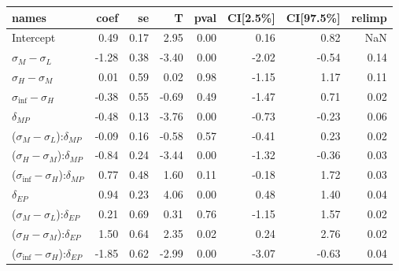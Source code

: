 \begin{tabular}{lrrrrrrr}
\toprule
                                       names &  coef &   se &     T &  pval &  CI[2.5\%] &  CI[97.5\%] &  relimp \\
\midrule
                                   Intercept &  0.49 & 0.17 &  2.95 &  0.00 &       0.16 &        0.82 &     NaN \\
                   $\sigma_{M} - \sigma_{L}$ & -1.28 & 0.38 & -3.40 &  0.00 &      -2.02 &       -0.54 &    0.14 \\
                   $\sigma_{H} - \sigma_{M}$ &  0.01 & 0.59 &  0.02 &  0.98 &      -1.15 &        1.17 &    0.11 \\
                $\sigma_{\inf} - \sigma_{H}$ & -0.38 & 0.55 & -0.69 &  0.49 &      -1.47 &        0.71 &    0.02 \\
                               $\delta_{MP}$ & -0.48 & 0.13 & -3.76 &  0.00 &      -0.73 &       -0.23 &    0.06 \\
   ($\sigma_{M} - \sigma_{L}$):$\delta_{MP}$ & -0.09 & 0.16 & -0.58 &  0.57 &      -0.41 &        0.23 &    0.02 \\
   ($\sigma_{H} - \sigma_{M}$):$\delta_{MP}$ & -0.84 & 0.24 & -3.44 &  0.00 &      -1.32 &       -0.36 &    0.03 \\
($\sigma_{\inf} - \sigma_{H}$):$\delta_{MP}$ &  0.77 & 0.48 &  1.60 &  0.11 &      -0.18 &        1.72 &    0.03 \\
                               $\delta_{EP}$ &  0.94 & 0.23 &  4.06 &  0.00 &       0.48 &        1.40 &    0.04 \\
   ($\sigma_{M} - \sigma_{L}$):$\delta_{EP}$ &  0.21 & 0.69 &  0.31 &  0.76 &      -1.15 &        1.57 &    0.02 \\
   ($\sigma_{H} - \sigma_{M}$):$\delta_{EP}$ &  1.50 & 0.64 &  2.35 &  0.02 &       0.24 &        2.76 &    0.02 \\
($\sigma_{\inf} - \sigma_{H}$):$\delta_{EP}$ & -1.85 & 0.62 & -2.99 &  0.00 &      -3.07 &       -0.63 &    0.04 \\
\bottomrule
\end{tabular}


